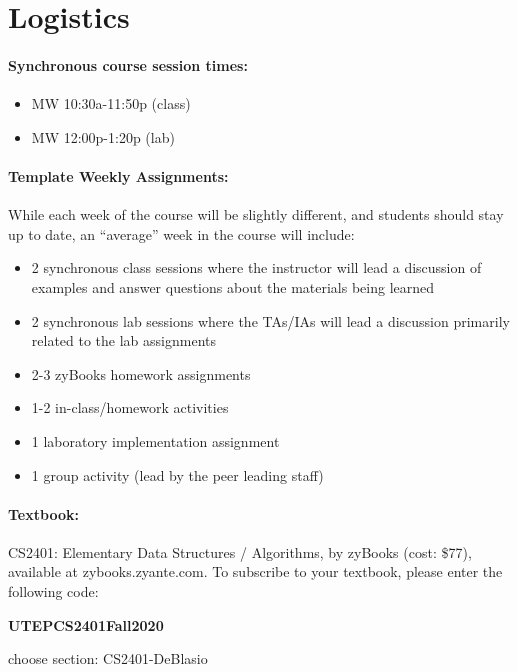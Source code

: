 \documentclass[12pt]{scrartcl}
\begin{document}
\clearpage
\tableofcontents

\section{Logistics}
\paragraph{Synchronous course session times:}
\begin{itemize}
\item MW 10:30a-11:50p (class)
\item MW 12:00p-1:20p (lab)
\end{itemize}

\paragraph{Template Weekly Assignments:} While each week of the course will be slightly different, and students should stay up to date, an ``average'' week in the course will include:
\begin{itemize}
\item 2 synchronous class sessions where the instructor will lead a discussion of examples and answer questions about the materials being learned
\item 2 synchronous lab sessions where the TAs/IAs will lead a discussion primarily related to the lab assignments
\item 2-3 zyBooks homework assignments
\item 1-2 in-class/homework activities
\item 1 laboratory implementation assignment
\item 1 group activity (lead by the peer leading staff) 
\end{itemize}

\paragraph{Textbook:} CS2401: Elementary Data Structures / Algorithms, by zyBooks (cost: \$77), available at zybooks.zyante.com. To subscribe to your textbook, please enter the following code: 
\begin{center}
\textbf{\Large UTEPCS2401Fall2020}
\end{center}
choose section: CS2401-DeBlasio 
\end{document}
